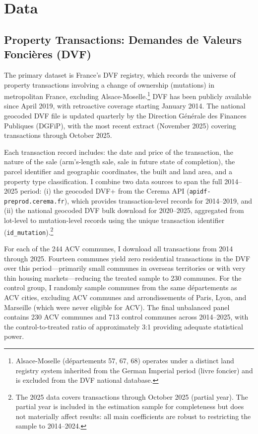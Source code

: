 \documentclass[12pt]{article}
\begin{document}
\section{Data}

\subsection{Property Transactions: Demandes de Valeurs Fonci\`{e}res (DVF)}

The primary dataset is France's DVF registry, which records the universe of property transactions involving a change of ownership (mutations) in metropolitan France, excluding Alsace-Moselle.\footnote{Alsace-Moselle (d\'{e}partements 57, 67, 68) operates under a distinct land registry system inherited from the German Imperial period (livre foncier) and is excluded from the DVF national database.} DVF has been publicly available since April 2019, with retroactive coverage starting January 2014. The national geocoded DVF file is updated quarterly by the Direction G\'{e}n\'{e}rale des Finances Publiques (DGFiP), with the most recent extract (November 2025) covering transactions through October 2025.

Each transaction record includes: the date and price of the transaction, the nature of the sale (arm's-length sale, sale in future state of completion), the parcel identifier and geographic coordinates, the built and land area, and a property type classification. I combine two data sources to span the full 2014--2025 period: (i) the geocoded DVF+ from the Cerema API (\texttt{apidf-preprod.cerema.fr}), which provides transaction-level records for 2014--2019, and (ii) the national geocoded DVF bulk download for 2020--2025, aggregated from lot-level to mutation-level records using the unique transaction identifier (\texttt{id\_mutation}).\footnote{The 2025 data covers transactions through October 2025 (partial year). The partial year is included in the estimation sample for completeness but does not materially affect results: all main coefficients are robust to restricting the sample to 2014--2024.}

For each of the 244 ACV communes, I download all transactions from 2014 through 2025. Fourteen communes yield zero residential transactions in the DVF over this period---primarily small communes in overseas territories or with very thin housing markets---reducing the treated sample to 230 communes. For the control group, I randomly sample communes from the same d\'{e}partements as ACV cities, excluding ACV communes and arrondissements of Paris, Lyon, and Marseille (which were never eligible for ACV). The final unbalanced panel contains 230 ACV communes and 713 control communes across 2014--2025, with the control-to-treated ratio of approximately 3:1 providing adequate statistical power.
\end{document}
